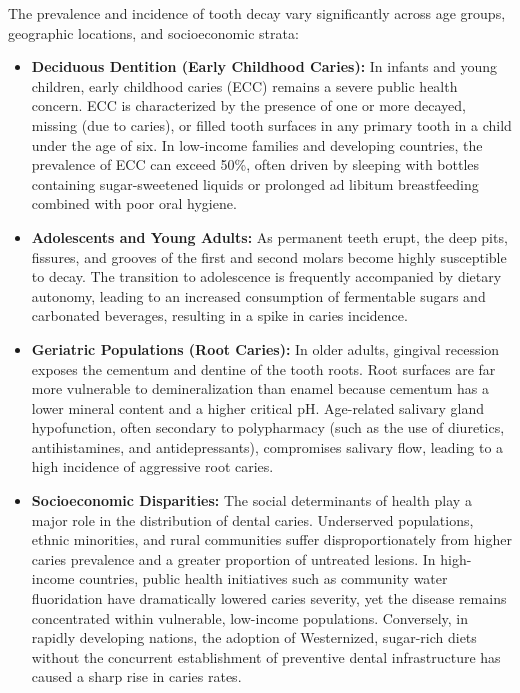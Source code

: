 The prevalence and incidence of tooth decay vary significantly across age groups, geographic locations, and socioeconomic strata:
\begin{itemize}
    \item \textbf{Deciduous Dentition (Early Childhood Caries):} In infants and young children, early childhood caries (ECC) remains a severe public health concern. ECC is characterized by the presence of one or more decayed, missing (due to caries), or filled tooth surfaces in any primary tooth in a child under the age of six. In low-income families and developing countries, the prevalence of ECC can exceed 50\%, often driven by sleeping with bottles containing sugar-sweetened liquids or prolonged ad libitum breastfeeding combined with poor oral hygiene.
    \item \textbf{Adolescents and Young Adults:} As permanent teeth erupt, the deep pits, fissures, and grooves of the first and second molars become highly susceptible to decay. The transition to adolescence is frequently accompanied by dietary autonomy, leading to an increased consumption of fermentable sugars and carbonated beverages, resulting in a spike in caries incidence.
    \item \textbf{Geriatric Populations (Root Caries):} In older adults, gingival recession exposes the cementum and dentine of the tooth roots. Root surfaces are far more vulnerable to demineralization than enamel because cementum has a lower mineral content and a higher critical pH. Age-related salivary gland hypofunction, often secondary to polypharmacy (such as the use of diuretics, antihistamines, and antidepressants), compromises salivary flow, leading to a high incidence of aggressive root caries.
    \item \textbf{Socioeconomic Disparities:} The social determinants of health play a major role in the distribution of dental caries. Underserved populations, ethnic minorities, and rural communities suffer disproportionately from higher caries prevalence and a greater proportion of untreated lesions. In high-income countries, public health initiatives such as community water fluoridation have dramatically lowered caries severity, yet the disease remains concentrated within vulnerable, low-income populations. Conversely, in rapidly developing nations, the adoption of Westernized, sugar-rich diets without the concurrent establishment of preventive dental infrastructure has caused a sharp rise in caries rates.
\end{itemize}

